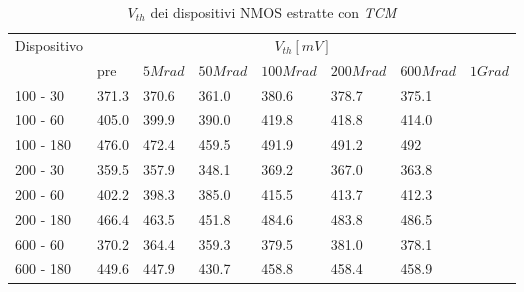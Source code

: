 \documentclass[12pt, letterpaper]{book}
\begin{document}
\begin{table}[H]
  \renewcommand{\arraystretch}{1.3}
  \begin{tabular}{m{2cm} m{0.8cm} m{1.1cm} m{1.3cm} m{1.5cm} m{1.5cm} m{1.5cm} m{1cm}}
    \toprule
    \multirow{2}{*}{Dispositivo} & \multicolumn{7}{c}{$V_{th} [mV] $}                                                                    \\
    \cmidrule{2-8}
                                 & pre                                & $5Mrad$ & $50Mrad$ & $100Mrad$ & $200Mrad$ & $600Mrad$ & $1Grad$ \\
    \midrule
    100 - 30                     & 371.3                              & 370.6   & 361.0    & 380.6     & 378.7     &  375.1         &         \\
    \hline
    100 - 60                     & 405.0                              & 399.9   & 390.0    & 419.8     & 418.8     &  414.0         &         \\
    \hline
    100 - 180                    & 476.0                              & 472.4   & 459.5    & 491.9     & 491.2     &  492         &         \\
    \hline
    200 - 30                     & 359.5                              & 357.9   & 348.1    & 369.2     & 367.0     &  363.8         &         \\
    \hline
    200 - 60                     & 402.2                              & 398.3   & 385.0    & 415.5     & 413.7     &  412.3         &         \\
    \hline
    200 - 180                    & 466.4                              & 463.5   & 451.8    & 484.6     & 483.8     &  486.5         &         \\
    \hline
    600 - 60                     & 370.2                              & 364.4   & 359.3    & 379.5     & 381.0     &  378.1         &         \\
    \hline
    600 - 180                    & 449.6                              & 447.9   & 430.7    & 458.8     & 458.4     &  458.9         &         \\
    \bottomrule
  \end{tabular}
  \caption{$V_{th}$ dei dispositivi NMOS estratte con \emph{TCM}}
  \label{tab:VthTCMN}
\end{table}
\end{document}

